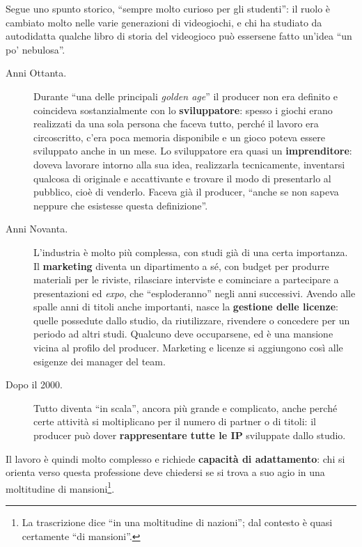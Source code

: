 Segue uno spunto storico, ``sempre molto curioso per gli studenti'': il ruolo è
cambiato molto nelle varie generazioni di videogiochi, e chi ha studiato da
autodidatta qualche libro di storia del videogioco può essersene fatto un'idea
``un po' nebulosa''.
\begin{description}
  \item[Anni Ottanta.] Durante ``una delle principali \emph{golden age}'' il
        producer non era definito e coincideva sostanzialmente con lo
        \textbf{sviluppatore}: spesso i giochi erano realizzati da una sola
        persona che faceva tutto, perché il lavoro era circoscritto, c'era poca
        memoria disponibile e un gioco poteva essere sviluppato anche in un
        mese. Lo sviluppatore era quasi un \textbf{imprenditore}: doveva
        lavorare intorno alla sua idea, realizzarla tecnicamente, inventarsi
        qualcosa di originale e accattivante e trovare il modo di presentarlo al
        pubblico, cioè di venderlo. Faceva già il producer, ``anche se non
        sapeva neppure che esistesse questa definizione''.
  \item[Anni Novanta.] L'industria è molto più complessa, con studi già di una
        certa importanza. Il \textbf{marketing} diventa un dipartimento a sé,
        con budget per produrre materiali per le riviste, rilasciare interviste
        e cominciare a partecipare a presentazioni ed \emph{expo}, che
        ``esploderanno'' negli anni successivi. Avendo alle spalle anni di
        titoli anche importanti, nasce la \textbf{gestione delle licenze}:
        quelle possedute dallo studio, da riutilizzare, rivendere o concedere
        per un periodo ad altri studi. Qualcuno deve occuparsene, ed è una
        mansione vicina al profilo del producer. Marketing e licenze si
        aggiungono così alle esigenze dei manager del team.
  \item[Dopo il 2000.] Tutto diventa ``in scala'', ancora più grande e
        complicato, anche perché certe attività si moltiplicano per il numero di
        partner o di titoli: il producer può dover \textbf{rappresentare tutte
        le IP} sviluppate dallo studio.
\end{description}
Il lavoro è quindi molto complesso e richiede \textbf{capacità di adattamento}:
chi si orienta verso questa professione deve chiedersi se si trova a suo agio
in una moltitudine di mansioni\footnote{La trascrizione dice ``in una
moltitudine di nazioni''; dal contesto è quasi certamente ``di mansioni''.}.

